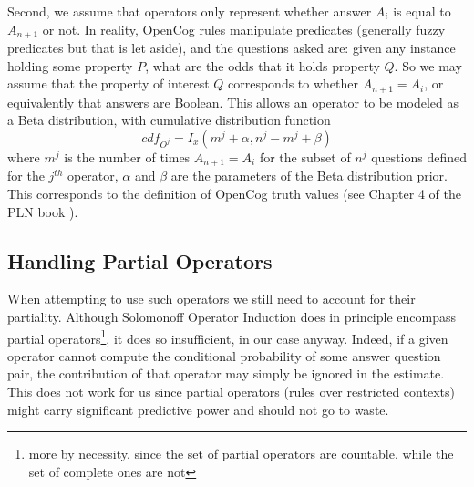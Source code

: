\documentclass[runningheads]{llncs}
\begin{document}
Second, we assume that operators only represent whether answer $A_i$
is equal to $A_{n+1}$ or not. In reality, OpenCog rules manipulate
predicates (generally fuzzy predicates but that is let aside), and the
questions asked are: given any instance holding some property $P$,
what are the odds that it holds property $Q$. So we may assume that
the property of interest $Q$ corresponds to whether $A_{n+1} = A_i$,
or equivalently that answers are Boolean. This allows an operator to
be modeled as a Beta distribution, with cumulative distribution
function
\begin{equation}
  \label{O-cdf}
  cdf_{O^j} = I_x(m^j + \alpha, n^j-m^j+\beta)
\end{equation}
where $m^j$ is 
the number of times $A_{n+1}=A_i$ for the subset of $n^j$ questions
defined for the $j^{th}$ operator, $\alpha$ and $\beta$ are the
parameters of the Beta distribution prior. This corresponds to the
definition of OpenCog truth values (see Chapter 4 of the PLN book
\cite{Goertzel09PLN}).

\subsection{Handling Partial Operators}
When attempting to use such operators we still need to account for
their partiality. Although Solomonoff Operator Induction does in
principle encompass partial operators\footnote{more by necessity,
  since the set of partial operators are countable, while the set of
  complete ones are not}, it does so insufficient, in our case
anyway. Indeed, if a given operator cannot compute the conditional
probability of some answer question pair, the contribution of that
operator may simply be ignored in the estimate. This does not work for
us since partial operators (rules over restricted contexts) might
carry significant predictive power and should not go to waste.
\end{document}
